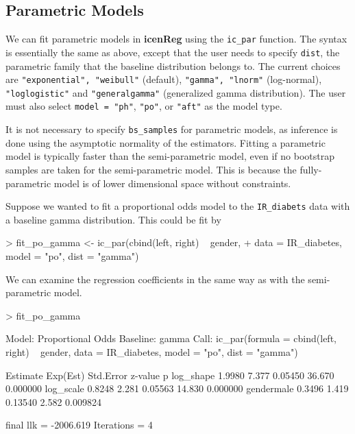 \documentclass[a4paper]{article}
\begin{document}
\subsection{Parametric Models}
  
We can fit parametric models in {\bf icenReg} using the \texttt{ic\_par} function. The syntax is essentially the same as above, except that the user needs to specify \texttt{dist}, the parametric family that the baseline distribution belongs to. The current choices are \texttt{"exponential", "weibull"} (default), \texttt{"gamma", "lnorm"} (log-normal), \texttt{"loglogistic"} and \texttt{"generalgamma"} (generalized gamma distribution). The user must also select \texttt{model = "ph"},  \texttt{"po"}, or \texttt{"aft"} as the model type. 
  
It is not necessary to specify \texttt{bs\_samples} for parametric models, as inference is done using the asymptotic normality of the estimators. Fitting a parametric model is typically faster than the semi-parametric model, even if no bootstrap samples are taken for the semi-parametric model. This is because the fully-parametric model is of lower dimensional space without constraints. 
  
Suppose we wanted to fit a proportional odds model to the \texttt{IR\_diabets} data with a baseline gamma distribution. This could be fit by
  
\begin{Schunk}
\begin{Sinput}
> fit_po_gamma <- ic_par(cbind(left, right) ~ gender,
+     data = IR_diabetes, model = "po", dist = "gamma")
\end{Sinput}
\end{Schunk}

  We can examine the regression coefficients in the same way as with the semi-parametric model.
  

\begin{Schunk}
\begin{Sinput}
> fit_po_gamma
\end{Sinput}
\begin{Soutput}
Model:  Proportional Odds
Baseline:  gamma 
Call: ic_par(formula = cbind(left, right) ~ gender, data = IR_diabetes, 
    model = "po", dist = "gamma")

           Estimate Exp(Est) Std.Error z-value        p
log_shape    1.9980    7.377   0.05450  36.670 0.000000
log_scale    0.8248    2.281   0.05563  14.830 0.000000
gendermale   0.3496    1.419   0.13540   2.582 0.009824

final llk =  -2006.619 
Iterations =  4 
\end{Soutput}
\end{Schunk}
\end{document}
